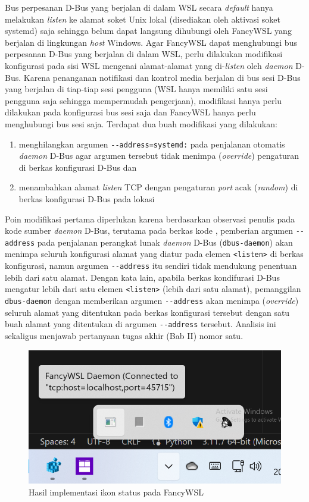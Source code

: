 Bus perpesanan D-Bus yang berjalan di dalam WSL secara \textit{default} hanya melakukan \textit{listen} ke alamat soket Unix lokal (disediakan oleh aktivasi soket systemd) saja sehingga belum dapat langsung dihubungi oleh FancyWSL yang berjalan di lingkungan \textit{host} Windows. Agar FancyWSL dapat menghubungi bus perpesanan D-Bus yang berjalan di dalam WSL, perlu dilakukan modifikasi konfigurasi pada sisi WSL mengenai alamat-alamat yang di-\textit{listen} oleh \textit{daemon} D-Bus. Karena penanganan notifikasi dan kontrol media berjalan di bus sesi D-Bus yang berjalan di tiap-tiap sesi pengguna (WSL hanya memiliki satu sesi pengguna saja sehingga mempermudah pengerjaan), modifikasi hanya perlu dilakukan pada konfigurasi bus sesi saja dan FancyWSL hanya perlu menghubungi bus sesi saja. Terdapat dua buah modifikasi yang dilakukan:
\begin{enumerate}
    \item menghilangkan argumen \verb|--address=systemd:| pada penjalanan otomatis \textit{daemon} D-Bus agar argumen tersebut tidak menimpa (\textit{override}) pengaturan di berkas konfigurasi D-Bus dan
    \item menambahkan alamat \textit{listen} TCP dengan pengaturan \textit{port} acak (\textit{random}) di berkas konfigurasi D-Bus pada lokasi 
\end{enumerate}
Poin modifikasi pertama diperlukan karena berdasarkan observasi penulis pada kode sumber \textit{daemon} D-Bus, terutama pada berkas kode  \cite{dbus-source-code-address-argumen-and-listen-config}, pemberian argumen \verb|--address| pada penjalanan perangkat lunak \textit{daemon} D-Bus (\verb|dbus-daemon|) akan menimpa seluruh konfigurasi alamat yang diatur pada elemen \verb|<listen>| di berkas konfigurasi, namun argumen \verb|--address| itu sendiri tidak mendukung penentuan lebih dari satu alamat. Dengan kata lain, apabila berkas kondifurasi D-Bus mengatur lebih dari satu elemen \verb|<listen>| (lebih dari satu alamat), pemanggilan \verb|dbus-daemon| dengan memberikan argumen \verb|--address| akan menimpa (\textit{override}) seluruh alamat yang ditentukan pada berkas konfigurasi tersebut dengan satu buah alamat yang ditentukan di argumen \verb|--address| tersebut. Analisis ini sekaligus menjawab pertanyaan tugas akhir (Bab II) nomor satu.

\begin{figure}
    \centering
    \includegraphics[width=0.5\linewidth]{archives//contents-template-pak-prapto//chapter-4/Screenshot 2023-12-20 114455.png}
    \caption{Hasil implementasi ikon status pada FancyWSL}
\end{figure}


